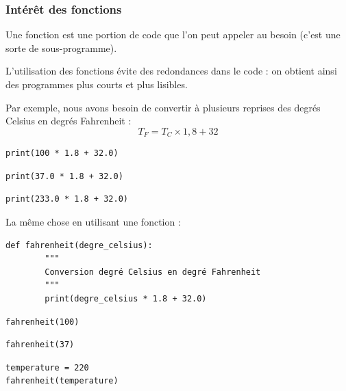 \documentclass{beamer}
\begin{document}
\begin{frame}
\frametitle{Intérêt des fonctions}

Une fonction est une portion de code que l'on peut appeler au besoin (c'est une sorte de sous-programme).

L'utilisation des fonctions évite des redondances dans le code : on obtient ainsi des programmes plus courts et plus lisibles.

Par exemple, nous avons besoin de convertir à plusieurs reprises des degrés Celsius en degrés Fahrenheit :
$$T_F = T_C \times 1,8 + 32 $$

\begin{verbatim}
print(100 * 1.8 + 32.0)
\end{verbatim}

\begin{verbatim}
print(37.0 * 1.8 + 32.0)
\end{verbatim}

\begin{verbatim}
print(233.0 * 1.8 + 32.0)
\end{verbatim}
\end{frame}

\begin{frame}

La même chose en utilisant une fonction :

\begin{verbatim}
def fahrenheit(degre_celsius):
        """
        Conversion degré Celsius en degré Fahrenheit
        """
        print(degre_celsius * 1.8 + 32.0)
\end{verbatim}

\begin{verbatim}
fahrenheit(100)
\end{verbatim}

\begin{verbatim}
fahrenheit(37)
\end{verbatim}

\begin{verbatim}
temperature = 220
fahrenheit(temperature)
\end{verbatim}
\end{frame}
\end{document}
